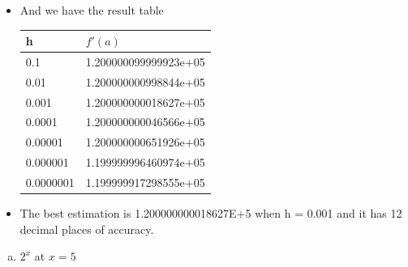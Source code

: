 \documentclass[12pt,en,a4paper]{article}
\begin{document}
\begin{itemize}
		\item And we have the result table
		\begin{table}[h]
			\centering
			\begin{tabular}{|l|l|}
				\hline
				h & \(f'(a)\) \\ \hline
				0.1 & 1.200000099999923e+05 \\ \hline
				0.01 & 1.200000000998844e+05 \\ \hline
				0.001 & 1.200000000018627e+05 \\ \hline
				0.0001 & 1.200000000046566e+05 \\ \hline
				0.00001 & 1.200000000651926e+05 \\ \hline
				0.000001 & 1.199999996460974e+05 \\ \hline
				0.0000001 & 1.199999917298555e+05 \\ \hline
			\end{tabular}
		\end{table}
		\item The best estimation is 1.200000000018627E+5 when h = 0.001 and it has 12 decimal places of accuracy.
	\end{itemize}
	\begin{enumerate}[d)]
		\item \(2^{x}\) at \(x=5\)
	\end{enumerate}
\end{document}

